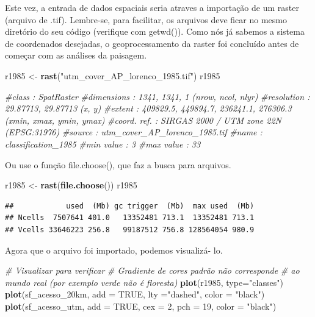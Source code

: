 \documentclass[
]{article}
\newenvironment{Shaded}{\begin{snugshade}}{\end{snugshade}}
\newcommand{\AttributeTok}[1]{\textcolor[rgb]{0.13,0.29,0.53}{#1}}
\newcommand{\CommentTok}[1]{\textcolor[rgb]{0.56,0.35,0.01}{\textit{#1}}}
\newcommand{\ConstantTok}[1]{\textcolor[rgb]{0.56,0.35,0.01}{#1}}
\newcommand{\DecValTok}[1]{\textcolor[rgb]{0.00,0.00,0.81}{#1}}
\newcommand{\FunctionTok}[1]{\textcolor[rgb]{0.13,0.29,0.53}{\textbf{#1}}}
\newcommand{\NormalTok}[1]{#1}
\newcommand{\OtherTok}[1]{\textcolor[rgb]{0.56,0.35,0.01}{#1}}
\newcommand{\StringTok}[1]{\textcolor[rgb]{0.31,0.60,0.02}{#1}}
\begin{document}
Este vez, a entrada de dados espaciais seria atraves a importação de
um raster (arquivo de .tif). Lembre-se, para facilitar, os arquivos deve
ficar no mesmo diretório do seu código
(verifique com getwd()).
Como nós já sabemos a sistema de coordenados desejadas,
o geoprocessamento da raster foi concluído antes de começar com as
análises da paisagem.

\begin{Shaded}
\begin{Highlighting}[]
\NormalTok{r1985 }\OtherTok{\textless{}{-}} \FunctionTok{rast}\NormalTok{(}\StringTok{"utm\_cover\_AP\_lorenco\_1985.tif"}\NormalTok{)}
\NormalTok{r1985}

\CommentTok{\#class       : SpatRaster }
\CommentTok{\#dimensions  : 1341, 1341, 1  (nrow, ncol, nlyr)}
\CommentTok{\#resolution  : 29.87713, 29.87713  (x, y)}
\CommentTok{\#extent      : 409829.5, 449894.7, 236241.1, 276306.3  (xmin, xmax, ymin, ymax)}
\CommentTok{\#coord. ref. : SIRGAS 2000 / UTM zone 22N (EPSG:31976) }
\CommentTok{\#source      : utm\_cover\_AP\_lorenco\_1985.tif }
\CommentTok{\#name        : classification\_1985 }
\CommentTok{\#min value   :                   3 }
\CommentTok{\#max value   :                  33 }
\end{Highlighting}
\end{Shaded}

Ou use o função file.choose(), que faz a busca
para arquivos.

\begin{Shaded}
\begin{Highlighting}[]
\NormalTok{r1985 }\OtherTok{\textless{}{-}} \FunctionTok{rast}\NormalTok{(}\FunctionTok{file.choose}\NormalTok{())}
\NormalTok{r1985}
\end{Highlighting}
\end{Shaded}

\begin{verbatim}
##            used  (Mb) gc trigger  (Mb)  max used  (Mb)
## Ncells  7507641 401.0   13352481 713.1  13352481 713.1
## Vcells 33646223 256.8   99187512 756.8 128564054 980.9
\end{verbatim}

Agora que o arquivo foi importado, podemos visualizá- lo.

\begin{Shaded}
\begin{Highlighting}[]
\CommentTok{\# Visualizar para verificar}
\CommentTok{\# Gradiente de cores padrão não corresponde }
\CommentTok{\# ao mundo real (por exemplo verde não é floresta)}
\FunctionTok{plot}\NormalTok{(r1985, }\AttributeTok{type=}\StringTok{"classes"}\NormalTok{) }
\FunctionTok{plot}\NormalTok{(sf\_acesso\_20km, }\AttributeTok{add =} \ConstantTok{TRUE}\NormalTok{, }\AttributeTok{lty =}\StringTok{"dashed"}\NormalTok{, }\AttributeTok{color =} \StringTok{"black"}\NormalTok{)}
\FunctionTok{plot}\NormalTok{(sf\_acesso\_utm, }\AttributeTok{add =} \ConstantTok{TRUE}\NormalTok{, }\AttributeTok{cex =} \DecValTok{2}\NormalTok{, }\AttributeTok{pch =} \DecValTok{19}\NormalTok{, }\AttributeTok{color =} \StringTok{"black"}\NormalTok{)}
\end{Highlighting}
\end{Shaded}
\end{document}
